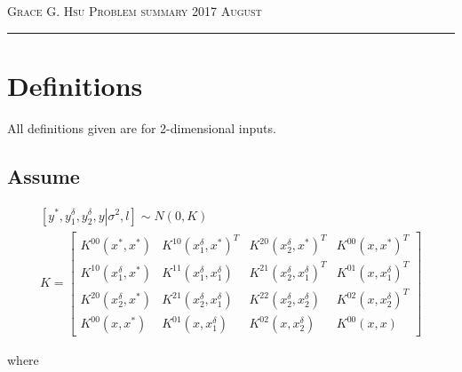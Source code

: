 \documentclass[12pt]{amsart}
\begin{document}
\thispagestyle{empty}

{\scshape Grace G. Hsu} \hfill {\scshape Problem summary} \hfill {\scshape 2017 August}
 
\medskip

\hrule

\bigskip



\section{Definitions}
All definitions given are for 2-dimensional inputs. 
\subsection{Assume}
  \begin{gather}
\left[ {{y^*},y_1^\delta ,y_2^\delta, y \left| {{\sigma ^2},l} \right.} \right] \sim N\left( {0,K} \right) \\
K = \left[ {\begin{array}{*{20}{c}}
{{K^{00}}\left( {{x^*},{x^*}} \right)}&{{K^{10}}{{\left( {x_1^\delta ,{x^*}} \right)}^T}}&{{K^{20}}{{\left( {x_2^\delta ,{x^*}} \right)}^T}}&{{K^{00}}{{\left( {x,{x^*}} \right)}^T}}\\
{{K^{10}}\left( {x_1^\delta ,{x^*}} \right)}&{{K^{11}}\left( {x_1^\delta ,x_1^\delta } \right)}&{{K^{21}}{{\left( {x_2^\delta ,x_1^\delta } \right)}^T}}&{{K^{01}}{{\left( {x,x_1^\delta } \right)}^T}}\\
{{K^{20}}\left( {x_2^\delta ,{x^*}} \right)}&{{K^{21}}\left( {x_2^\delta ,x_1^\delta } \right)}&{{K^{22}}\left( {x_2^\delta ,x_2^\delta } \right)}&{{K^{02}}{{\left( {x,x_2^\delta } \right)}^T}}\\
{{K^{00}}\left( {x,{x^*}} \right)}&{{K^{01}}\left( {x,x_1^\delta } \right)}&{{K^{02}}\left( {x,x_2^\delta } \right)}&{{K^{00}}\left( {x,x} \right)}
\end{array}} \right]
  \end{gather}

    where 
    
\end{document}
